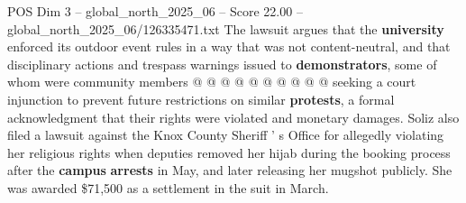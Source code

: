\begin{textsample}{POS Dim 3 – global\_north\_2025\_06 – Score 22.00 – global\_north\_2025\_06/126335471.txt}
The lawsuit argues that the \textbf{university} enforced its outdoor event rules in a way that was not content-neutral, and that disciplinary actions and trespass warnings issued to \textbf{demonstrators}, some of whom were community members @ @ @ @ @ @ @ @ @ @ seeking a court injunction to prevent future restrictions on similar \textbf{protests}, a formal acknowledgment that their rights were violated and monetary damages.
Soliz also filed a lawsuit against the Knox County Sheriff ' s Office for allegedly violating her religious rights when deputies removed her hijab during the booking process after the \textbf{campus} \textbf{arrests} in May, and later releasing her mugshot publicly.
She was awarded \$71,500 as a settlement in the suit in March.

\end{textsample}
